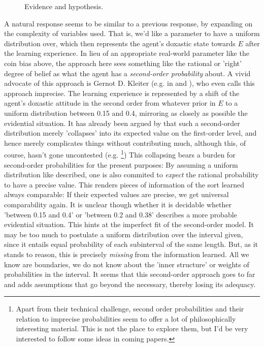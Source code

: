 \documentclass[11pt, a4paper]{scrartcl}
\begin{document}
\begin{figure}
\centering
{}
\caption{Evidence and hypothesis.}
\label{fig:net}
\end{figure}

A natural response seems to be similar to a previous response, by expanding on the complexity of variables used. That is, we'd like a parameter to have a uniform distribution over, which then represents the agent's doxastic state towards $E$ after the learning experience. In lieu of an appropriate real-world parameter like the coin bias above, the approach here sees something like the rational or 'right' degree of belief as what the agent has a \emph{second-order probability} about. A vivid advocate of this approach is Gernot D. Kleiter (e.g. in \citet{KLEITER1996143} and \citet{Pfeifer2007-PFEHRW}), who even calls this approach imprecise. The learning experience is represented by a shift of the agent's doxastic attitude in the second order from whatever prior in $E$ to a uniform distribution between 0.15 and 0.4, mirroring as closely as possible the evidential situation. It has already been argued by \citet[p.58]{Savage1954-SAVTFO-2} that such a second-order distribution merely 'collapses' into its expected value on the first-order level, and hence merely complicates things without contributing much, although this, of course, hasn't gone uncontested (e.g. \citet{Hansson2008-HANDWN}\footnote{Apart from their technical challenge, second order probabilities and their relation to imprecise probabilities seem to offer a lot of philosophically interesting material. This is not the place to explore them, but I'd be very interested to follow some ideas in coming papers.}) This collapsing bears a burden for second-order probabilities for the present purposes: By assuming a uniform distribution like described, one is also commited to \emph{expect} the rational probability to have a precise value. This renders pieces of information of the sort learned always comparable: If their expected values are precise, we get universal comparability again. It is unclear though whether it is decidable whether 'between 0.15 and 0.4' or 'between 0.2 and 0.38' describes a more probable evidential situation. This hints at the imperfect fit of the second-order model. It may be too much to postulate a uniform distribution over the interval given, since it entails equal probability of each subinterval of the same length. But, as it stands to reason, this is precisely \emph{missing} from the information learned. All we know are boundaries, we do not know about the 'inner structure' or weights of probabilities in the interval. It seems that this second-order approach goes to far and adds assumptions that go beyond the necessary, thereby losing its adequacy. 
\end{document}
